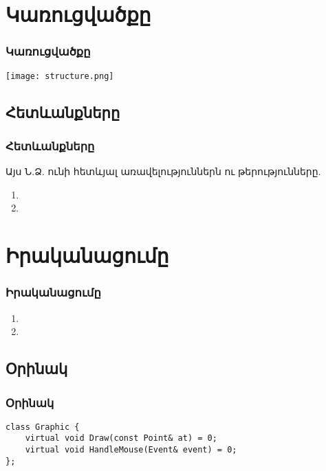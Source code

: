 \documentclass{beamer}
\begin{document}
\section{Կառուցվածքը}
\begin{frame}\frametitle{Կառուցվածքը}
\begin{center}
    \texttt{[image: structure.png]}
\end{center}
\end{frame}

\subsection{Հետևանքները}
\begin{frame}\frametitle{Հետևանքները}
Այս Ն.Ձ. ունի հետևյալ առավելություններն ու թերությունները.
\vfill
\begin{enumerate}
    \item  \pause \vfill
    \item
\end{enumerate}
\end{frame}

\section{Իրականացումը}
\begin{frame}\frametitle{Իրականացումը}
\begin{enumerate}
    \item \vfill
    \item
\end{enumerate}
\end{frame}

\subsection{Օրինակ}
\begin{frame}[fragile]\frametitle{Օրինակ}
\begin{english}
\begin{verbatim}
class Graphic {
    virtual void Draw(const Point& at) = 0;
    virtual void HandleMouse(Event& event) = 0;
};
\end{verbatim}
\end{english}
\end{frame}
\end{document}
